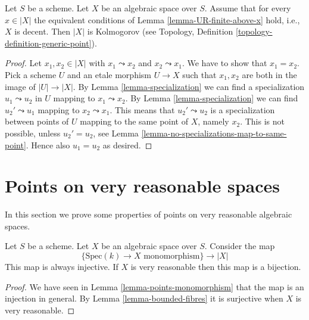 \begin{lemma}
\label{lemma-kolmogorov}
Let $S$ be a scheme.
Let $X$ be an algebraic space over $S$.
Assume that for every $x \in |X|$ the equivalent conditions
of Lemma \ref{lemma-UR-finite-above-x} hold, i.e., $X$ is decent.
Then $|X|$ is Kolmogorov (see
Topology, Definition \ref{topology-definition-generic-point}).
\end{lemma}

\begin{proof}
Let $x_1, x_2 \in |X|$ with $x_1 \leadsto x_2$ and $x_2 \leadsto x_1$.
We have to show that $x_1 = x_2$. Pick a scheme $U$ and an etale morphism
$U \to X$ such that $x_1, x_2$ are both in the image of $|U| \to |X|$.
By Lemma \ref{lemma-specialization} we can find a specialization
$u_1 \leadsto u_2$ in $U$ mapping to $x_1 \leadsto x_2$.
By Lemma \ref{lemma-specialization} we can find
$u_2' \leadsto u_1$ mapping to $x_2 \leadsto x_1$. This means that
$u_2' \leadsto u_2$ is a specialization between points of $U$ mapping to
the same point of $X$, namely $x_2$. This is not possible, unless
$u_2' = u_2$, see
Lemma \ref{lemma-no-specializations-map-to-same-point}. Hence
also $u_1 = u_2$ as desired.
\end{proof}
















\section{Points on very reasonable spaces}
\label{section-points-very-reasonable}

\noindent
In this section we prove some properties of points on
very reasonable algebraic spaces.

\begin{lemma}
\label{lemma-very-reasonable-points-monomorphism}
Let $S$ be a scheme. Let $X$ be an algebraic space over $S$.
Consider the map
$$
\{\text{Spec}(k) \to X \text{ monomorphism}\}
\longrightarrow
|X|
$$
This map is always injective. If $X$ is very reasonable then this map
is a bijection.
\end{lemma}

\begin{proof}
We have seen in Lemma \ref{lemma-points-monomorphism}
that the map is an injection in general.
By Lemma \ref{lemma-bounded-fibres} it is surjective when $X$ is
very reasonable.
\end{proof}

